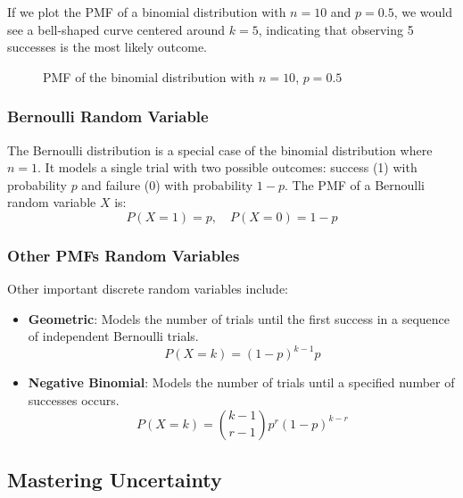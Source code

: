 If we plot the PMF of a binomial distribution with $n=10$ and $p=0.5$, we would see a bell-shaped curve centered around $k=5$, indicating that observing 5 successes is the most likely outcome.

\begin{figure}[h]
    \centering
    
    \caption{PMF of the binomial distribution with $n=10$, $p=0.5$}
\end{figure}

\subsubsection{Bernoulli Random Variable}
The Bernoulli distribution is a special case of the binomial distribution where $n=1$.
It models a single trial with two possible outcomes: success (1) with probability $p$ and failure (0) with probability $1-p$.
The PMF of a Bernoulli random variable $X$ is:
\begin{equation}
    P(X=1) = p, \quad P(X=0) = 1-p
\end{equation}

\subsubsection{Other PMFs Random Variables}
Other important discrete random variables include:
\begin{itemize}
    \item \textbf{Geometric}: Models the number of trials until the first success in a sequence of independent Bernoulli trials.
    \[ P(X=k) = (1-p)^{k-1} p \]
    \item \textbf{Negative Binomial}: Models the number of trials until a specified number of successes occurs.
    \[ P(X=k) = \binom{k-1}{r-1} p^r (1-p)^{k-r} \]
\end{itemize}

\subsection{Mastering Uncertainty}

